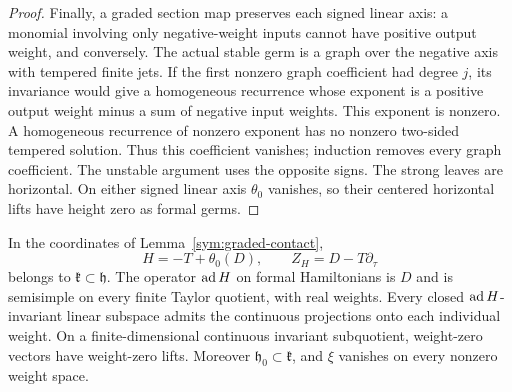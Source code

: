 \begin{proof}
Finally, a graded section map preserves each signed linear axis:
a monomial involving only negative-weight inputs cannot have positive
output weight, and conversely.  The actual stable germ is a graph
over the negative axis with tempered finite jets.  If the first
nonzero graph coefficient had degree $j$, its invariance would give
a homogeneous recurrence whose exponent is a positive output weight
minus a sum of negative input weights.  This exponent is nonzero.
A homogeneous recurrence of nonzero exponent has no nonzero
two-sided tempered solution.  Thus this coefficient vanishes;
induction removes every graph coefficient.  The unstable argument
uses the opposite signs.  The strong leaves are horizontal.  On
either signed linear axis $\theta_0$ vanishes, so their centered
horizontal lifts have height zero as formal germs.
\end{proof}

\begin{proposition}
\label{sym:dilation}
In the coordinates of Lemma~\ref{sym:graded-contact},
\begin{equation}
 \label{sym:dilation-hamiltonian}
 H=-T+\theta_0(D),\qquad Z_H=D-T\partial_\tau
\end{equation}
belongs to $\mathfrak k\subset\mathfrak h$.
The operator $\operatorname{ad} H$ on formal Hamiltonians is $D$ and is semisimple
on every finite Taylor quotient, with real weights.  Every closed
$\operatorname{ad} H$-invariant linear subspace admits the continuous projections
onto each individual weight.  On a finite-dimensional continuous
invariant subquotient, weight-zero vectors have weight-zero lifts.
Moreover $\mathfrak h_0\subset\mathfrak k$, and
$\xi$ vanishes on every nonzero weight space.
\end{proposition}

